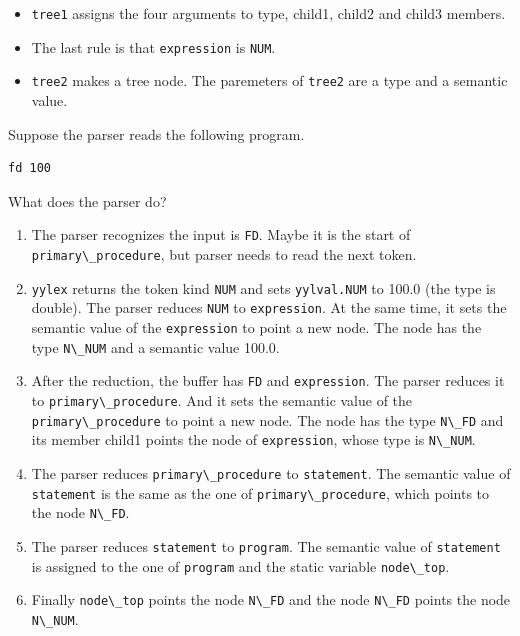 \begin{itemize}
\tightlist
\item
  \passthrough{\lstinline!tree1!} assigns the four arguments to type,
  child1, child2 and child3 members.
\item
  The last rule is that \passthrough{\lstinline!expression!} is
  \passthrough{\lstinline!NUM!}.
\item
  \passthrough{\lstinline!tree2!} makes a tree node. The paremeters of
  \passthrough{\lstinline!tree2!} are a type and a semantic value.
\end{itemize}

Suppose the parser reads the following program.

\begin{lstlisting}
fd 100
\end{lstlisting}

What does the parser do?

\begin{enumerate}
\def\labelenumi{\arabic{enumi}.}
\tightlist
\item
  The parser recognizes the input is \passthrough{\lstinline!FD!}. Maybe
  it is the start of \passthrough{\lstinline!primary\_procedure!}, but
  parser needs to read the next token.
\item
  \passthrough{\lstinline!yylex!} returns the token kind
  \passthrough{\lstinline!NUM!} and sets
  \passthrough{\lstinline!yylval.NUM!} to 100.0 (the type is double).
  The parser reduces \passthrough{\lstinline!NUM!} to
  \passthrough{\lstinline!expression!}. At the same time, it sets the
  semantic value of the \passthrough{\lstinline!expression!} to point a
  new node. The node has the type \passthrough{\lstinline!N\_NUM!} and a
  semantic value 100.0.
\item
  After the reduction, the buffer has \passthrough{\lstinline!FD!} and
  \passthrough{\lstinline!expression!}. The parser reduces it to
  \passthrough{\lstinline!primary\_procedure!}. And it sets the semantic
  value of the \passthrough{\lstinline!primary\_procedure!} to point a
  new node. The node has the type \passthrough{\lstinline!N\_FD!} and
  its member child1 points the node of
  \passthrough{\lstinline!expression!}, whose type is
  \passthrough{\lstinline!N\_NUM!}.
\item
  The parser reduces \passthrough{\lstinline!primary\_procedure!} to
  \passthrough{\lstinline!statement!}. The semantic value of
  \passthrough{\lstinline!statement!} is the same as the one of
  \passthrough{\lstinline!primary\_procedure!}, which points to the node
  \passthrough{\lstinline!N\_FD!}.
\item
  The parser reduces \passthrough{\lstinline!statement!} to
  \passthrough{\lstinline!program!}. The semantic value of
  \passthrough{\lstinline!statement!} is assigned to the one of
  \passthrough{\lstinline!program!} and the static variable
  \passthrough{\lstinline!node\_top!}.
\item
  Finally \passthrough{\lstinline!node\_top!} points the node
  \passthrough{\lstinline!N\_FD!} and the node
  \passthrough{\lstinline!N\_FD!} points the node
  \passthrough{\lstinline!N\_NUM!}.
\end{enumerate}

